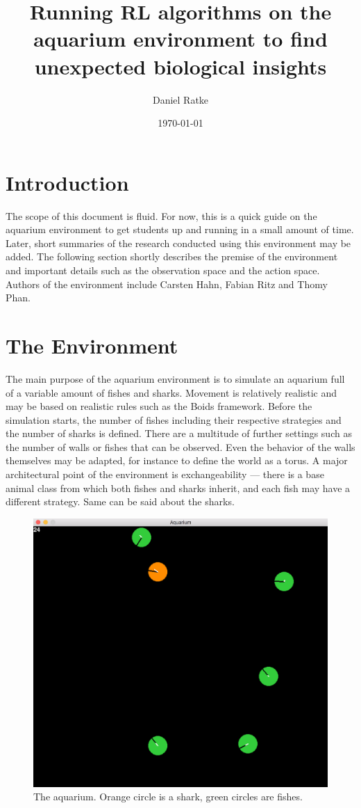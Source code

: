 \documentclass[12pt, letterpaper, fleqn, notitlepage]{article}
\title{Running RL algorithms on the aquarium environment to find unexpected biological insights}
\date{\today}
\author{Daniel Ratke}
\begin{document}
\maketitle

\section{Introduction}

The scope of this document is fluid. For now, this is a quick guide on the
aquarium environment to get students up and running in a small amount of time.
Later, short summaries of the research conducted using this environment may be
added.
%
The following section shortly describes the premise of the environment and
important details such as the observation space and the action space.
%
Authors of the environment include Carsten Hahn, Fabian Ritz and Thomy Phan.

\section{The Environment}

The main purpose of the aquarium environment is to simulate an aquarium full of
a variable amount of fishes and sharks. Movement is relatively realistic and
may be based on realistic rules such as the Boids framework.
%
Before the simulation starts, the number of fishes including their respective
strategies and the number of sharks is defined. There are a multitude of
further settings such as the number of walls or fishes that can be observed.
Even the behavior of the walls themselves may be adapted, for instance to
define the world as a torus.
%
A major architectural point of the environment is exchangeability --- there is
a base animal class from which both fishes and sharks inherit, and each fish
may have a different strategy. Same can be said about the sharks.

\begin{figure}[ht!]
  \includegraphics[width=\linewidth]{demo.png}
  \caption{The aquarium. Orange circle is a shark, green circles are fishes.}\label{fig:demo}
\end{figure}
\end{document}
